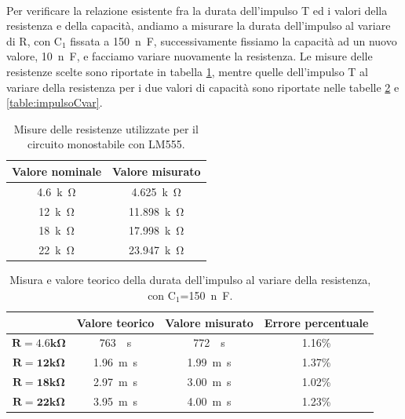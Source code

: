 \documentclass{report}
\begin{document}
\\Per verificare la relazione esistente fra la durata dell'impulso T ed i valori della resistenza e della capacità, andiamo a misurare la durata dell'impulso al variare di R, con $\mathrm{C_1}$ fissata a \SI{150}{n\farad}, successivamente fissiamo la capacità ad un nuovo valore, \SI{10}{n\farad}, e facciamo variare nuovamente la resistenza. Le misure delle resistenze scelte sono riportate in tabella \ref{table:mis_res2}, mentre quelle dell'impulso T al variare della resistenza per i due valori di capacità sono riportate nelle tabelle \ref{table:impulsoRvar} e \ref{table:impulsoCvar}.
\begin{table}[h!]
	\centering
	\begin{tabular}{|c|c|}
	\hline
		\textbf{Valore nominale} & \textbf{Valore misurato}\\ 
		\hline
		\SI{4.6}{k\ohm} & \SI{4.625}{k\ohm} \\ 
		\hline
		 \SI{12}{k\ohm} & \SI{11.898}{k\ohm} \\ 
		\hline
		\SI{18}{k\ohm} & \SI{17.998}{k\ohm} \\ 
		\hline
		 \SI{22}{k\ohm} & \SI{23.947}{k\ohm} \\ 
		\hline
	\end{tabular}
	\caption{Misure delle resistenze utilizzate per il circuito monostabile con LM555.}
	\label{table:mis_res2}
\end{table}
\begin{table}[h!]
	\centering
	\begin{tabular}{|c|c|c|c|}
		\cline{2-4} 
		\multicolumn{1}{c|}{} & \textbf{Valore teorico} & \textbf{Valore misurato}& \textbf{Errore percentuale}\\ 
		\hline
		$\mathbf{{R = 4.6k}\Omega}$ & \SI{763}{\mu\second} & \SI{772}{\mu\second} & 1.16\% \\ 
		\hline
		$\mathbf{{R = 12k}\Omega}$ & \SI{1.96}{m\second} & \SI{1.99}{m\second} & 1.37\% \\ 
		\hline
		$\mathbf{{R = 18k}\Omega}$ & \SI{2.97}{m\second} & \SI{3.00}{m\second} & 1.02\% \\ 
		\hline
		$\mathbf{{R = 22k}\Omega}$ & \SI{3.95}{m\second} & \SI{4.00}{m\second} & 1.23\% \\ 
		\hline
	\end{tabular}
	\caption{Misura e valore teorico della durata dell'impulso al variare della resistenza, con $\mathrm{C_1}$=\SI{150}{n\farad}.}
	\label{table:impulsoRvar}
\end{table}
\end{document}
